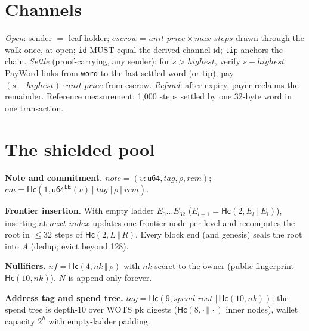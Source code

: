 \documentclass[10pt]{article}
\newcommand{\ct}[1]{\texttt{#1}}
\newcommand{\Hc}{\mathsf{Hc}}
\newcommand{\cat}{\,\Vert\,}
\begin{document}
\section{Channels}
\emph{Open}: sender $=$ leaf holder; $\mathit{escrow} = \mathit{unit\_price}\times\mathit{max\_steps}$ drawn through the walk once, at open; \ct{id} MUST equal the derived channel id; \ct{tip} anchors the chain. \emph{Settle} (proof-carrying, any sender): for $s > \mathit{highest}$, verify $s - \mathit{highest}$ PayWord links from \ct{word} to the last settled word (or tip); pay $(s-\mathit{highest})\cdot\mathit{unit\_price}$ from escrow. \emph{Refund}: after expiry, payer reclaims the remainder. Reference measurement: 1{,}000 steps settled by one 32-byte word in one transaction.

\section{The shielded pool}\label{sec:pool}
\textbf{Note and commitment.} $\mathit{note} = (v: \mathsf{u64}, \mathit{tag}, \rho, \mathit{rcm})$; $\mathit{cm} = \Hc(1, \mathsf{u64^{LE}}(v)\cat \mathit{tag}\cat\rho\cat \mathit{rcm})$.

\textbf{Frontier insertion.} With empty ladder $E_0 \ldots E_{32}$ ($E_{l+1} = \Hc(2, E_l \cat E_l)$), inserting at $\mathit{next\_index}$ updates one frontier node per level and recomputes the root in $\le 32$ steps of $\Hc(2, L\cat R)$. Every block end (and genesis) seals the root into $A$ (dedup; evict beyond 128).

\textbf{Nullifiers.} $\mathit{nf} = \Hc(4, \mathit{nk}\cat\rho)$ with $\mathit{nk}$ secret to the owner (public fingerprint $\Hc(10, \mathit{nk})$). $N$ is append-only forever.

\textbf{Address tag and spend tree.} $\mathit{tag} = \Hc(9, \mathit{spend\_root}\cat \Hc(10, \mathit{nk}))$; the spend tree is depth-10 over WOTS pk digests ($\Hc(8,\cdot\cat\cdot)$ inner nodes), wallet capacity $2^h$ with empty-ladder padding.
\end{document}
